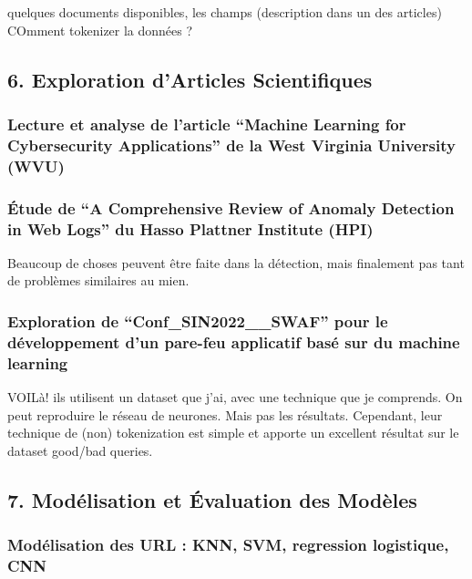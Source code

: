 \documentclass[
  letterpaper,
  DIV=11,
  numbers=noendperiod]{scrartcl}
\begin{document}
quelques documents disponibles, les champs (description dans un des
articles) COmment tokenizer la données ?

\subsection{6. Exploration d'Articles
Scientifiques}\label{exploration-darticles-scientifiques}

\subsubsection{Lecture et analyse de l'article ``Machine Learning for
Cybersecurity Applications'' de la West Virginia University
(WVU)}\label{lecture-et-analyse-de-larticle-machine-learning-for-cybersecurity-applications-de-la-west-virginia-university-wvu}

\subsubsection{Étude de ``A Comprehensive Review of Anomaly Detection in
Web Logs'' du Hasso Plattner Institute
(HPI)}\label{uxe9tude-de-a-comprehensive-review-of-anomaly-detection-in-web-logs-du-hasso-plattner-institute-hpi}

Beaucoup de choses peuvent être faite dans la détection, mais finalement
pas tant de problèmes similaires au mien.

\subsubsection{Exploration de ``Conf\_SIN2022\_\_SWAF'' pour le
développement d'un pare-feu applicatif basé sur du machine
learning}\label{exploration-de-conf_sin2022__swaf-pour-le-duxe9veloppement-dun-pare-feu-applicatif-basuxe9-sur-du-machine-learning}

VOILà! ils utilisent un dataset que j'ai, avec une technique que je
comprends. On peut reproduire le réseau de neurones. Mais pas les
résultats. Cependant, leur technique de (non) tokenization est simple et
apporte un excellent résultat sur le dataset good/bad queries.

\subsection{7. Modélisation et Évaluation des
Modèles}\label{moduxe9lisation-et-uxe9valuation-des-moduxe8les}

\subsubsection{Modélisation des URL : KNN, SVM, regression logistique,
CNN}\label{moduxe9lisation-des-url-knn-svm-regression-logistique-cnn}
\end{document}
